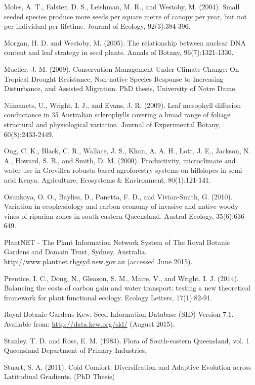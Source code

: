 \documentclass[openright,12pt,a4paper]{memoir}
\begin{document}
Moles, A. T., Falster, D. S., Leishman, M. R., and Westoby, M. (2004). Small seeded species produce more seeds per square metre of canopy per year, but not per individual per lifetime. Journal of Ecology, 92(3):384-396.

Morgan, H. D. and Westoby, M. (2005). The relationship between nuclear DNA content and leaf strategy in seed plants. Annals of Botany, 96(7):1321-1330.

Mueller, J. M. (2009). Conservation Management Under Climate Change: On Tropical Drought Resistance, Non-native Species Response to Increasing Disturbance, and Assisted Migration. PhD thesis, University of Notre Dame.

Niinemets, U., Wright, I. J., and Evans, J. R. (2009). Leaf mesophyll diffusion conductance in 35 Australian sclerophylls covering a broad range of foliage structural and physiological variation. Journal of Experimental Botany, 60(8):2433-2449.

Ong, C. K., Black, C. R., Wallace, J. S., Khan, A. A. H., Lott, J. E., Jackson, N. A., Howard, S. B., and Smith, D. M. (2000). Productivity, microclimate and water use in Grevillea robusta-based agroforestry systems on hillslopes in semi-arid Kenya. Agriculture, Ecosystems & Environment, 80(1):121-141.

Osunkoya, O. O., Bayliss, D., Panetta, F. D., and Vivian-Smith, G. (2010). Variation in ecophysiology and carbon economy of invasive and native woody vines of riparian zones in south-eastern Queensland. Austral Ecology, 35(6):636-649.

PlantNET - The Plant Information Network System of The Royal Botanic Gardens and Domain Trust, Sydney, Australia. \url{http://www.plantnet.rbgsyd.nsw.gov.au} (accessed June 2015).

Prentice, I. C., Dong, N., Gleason, S. M., Maire, V., and Wright, I. J. (2014). Balancing the costs of carbon gain and water transport: testing a new theoretical framework for plant functional ecology. Ecology Letters, 17(1):82-91.

Royal Botanic Gardens Kew. Seed Information Database (SID) Version 7.1. Available from: \url{http://data.kew.org/sid/} (August 2015).

Stanley, T. D. and Ross, E. M. (1983). Flora of South-eastern Queensland, vol. 1 Queensland Department of Primary Industries.

Stuart, S. A. (2011). Cold Comfort: Diversifcation and Adaptive Evolution across Latitudinal Gradients. (PhD Thesis)
\end{document}
